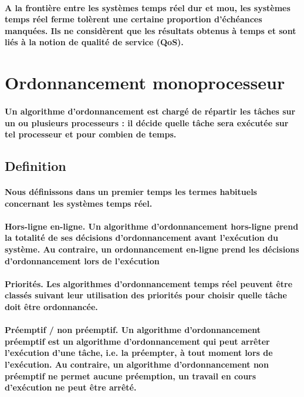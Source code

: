 \paragraph
{A la frontière entre les systèmes temps réel dur et mou, les systèmes temps réel ferme tolèrent une certaine proportion d’échéances manquées. Ils ne considèrent que les résultats obtenus à temps et sont liés à la notion de qualité de service (QoS).}

\section{Ordonnancement monoprocesseur}

\paragraph
{Un algorithme d’ordonnancement est chargé de répartir les tâches sur un ou plusieurs processeurs : il décide quelle tâche sera exécutée sur tel processeur et pour combien de temps. }

\subsection*{Definition}
\paragraph
{Nous définissons dans un premier temps les termes habituels concernant les systèmes temps réel.}

\paragraph{
\textbf{Hors-ligne en-ligne}. Un algorithme d’ordonnancement hors-ligne prend la totalité de ses décisions d’ordonnancement avant l’exécution du système. Au contraire, un ordonnancement en-ligne prend les décisions d’ordonnancement lors de l’exécution }

\paragraph{
\textbf{Priorités}. Les algorithmes d’ordonnancement temps réel peuvent être classés suivant leur utilisation des priorités pour choisir quelle tâche doit être ordonnancée. }

\paragraph{
\textbf{Préemptif / non préemptif}. Un algorithme d’ordonnancement préemptif est un algorithme d’ordonnancement qui peut arrêter l’exécution d’une tâche, i.e. la préempter, à tout moment lors de l’exécution. Au contraire, un algorithme d’ordonnancement non préemptif ne permet aucune préemption, un travail en cours d’exécution ne peut être arrêté.}

